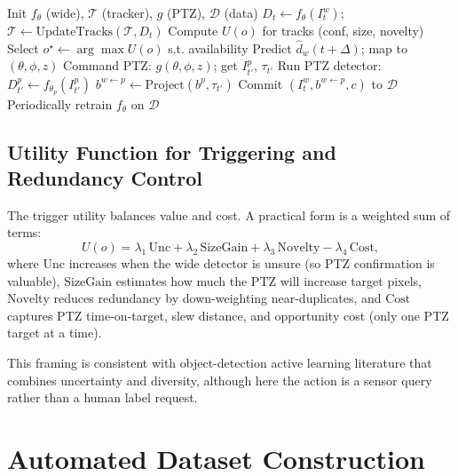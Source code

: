 \documentclass[conf]{new-aiaa}
\begin{document}
{\begin{algorithm}[t]
\caption{Real-time wide-to-PTZ acquisition}
\begin{algorithmic}[1]
\State Init $f_{\theta}$ (wide), $\mathcal{T}$ (tracker), $g$ (PTZ), $\mathcal{D}$ (data)
\State $D_t \leftarrow f_{\theta}(I^w_t)$; \quad $\mathcal{T}\leftarrow \mathrm{UpdateTracks}(\mathcal{T}, D_t)$
\State Compute $U(o)$ for tracks (conf, size, novelty)
\State Select $o^\star \leftarrow \arg\max U(o)$ s.t. availability
\State Predict $\hat{d}_w(t+\Delta)$; map to $(\theta,\phi, z)$
\State Command PTZ: $g(\theta,\phi,z)$; get $I^p_{t'}$, $\tau_{t'}$
\State Run PTZ detector: $D^p_{t'} \leftarrow f_{\theta_p}(I^p_{t'})$
\State $b^{w\leftarrow p} \leftarrow \mathrm{Project}(b^p,\tau_{t'})$
\State Commit $(I^w_t, b^{w\leftarrow p}, c)$ to $\mathcal{D}$
\EndIf
\EndIf
\EndFor
\State Periodically retrain $f_{\theta}$ on $\mathcal{D}$
\end{algorithmic}
\end{algorithm}

\subsection{Utility Function for Triggering and Redundancy Control}
The trigger utility balances value and cost. A practical form is a weighted sum of terms:
\begin{equation}
U(o) = \lambda_1\,\mathrm{Unc} + \lambda_2\,\mathrm{SizeGain} + \lambda_3\,\mathrm{Novelty} - \lambda_4\,\mathrm{Cost},
\end{equation}
where $\mathrm{Unc}$ increases when the wide detector is unsure (so PTZ confirmation is valuable), $\mathrm{SizeGain}$ estimates how much the PTZ will increase target pixels, $\mathrm{Novelty}$ reduces redundancy by down-weighting near-duplicates, and $\mathrm{Cost}$ captures PTZ time-on-target, slew distance, and opportunity cost (only one PTZ target at a time).
\par
This framing is consistent with object-detection active learning literature that combines uncertainty and diversity, although here the action is a sensor query rather than a human label request.

\section{Automated Dataset Construction}
}
\end{document}
